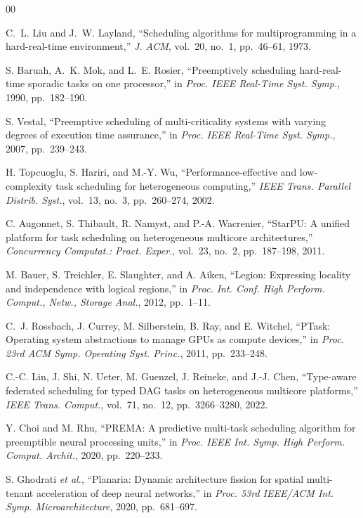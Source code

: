 \documentclass[lettersize,journal]{IEEEtran}
\begin{document}
\clearpage
\begin{thebibliography}{00}

C.~L. Liu and J.~W. Layland, ``Scheduling algorithms for multiprogramming in
a hard-real-time environment,'' \emph{J. ACM}, vol.~20, no.~1, pp.~46--61,
1973.

S. Baruah, A.~K. Mok, and L.~E. Rosier, ``Preemptively scheduling
hard-real-time sporadic tasks on one processor,'' in \emph{Proc. IEEE Real-Time
Syst. Symp.}, 1990, pp.~182--190.

S. Vestal, ``Preemptive scheduling of multi-criticality systems with varying
degrees of execution time assurance,'' in \emph{Proc. IEEE Real-Time Syst.
Symp.}, 2007, pp.~239--243.

H. Topcuoglu, S. Hariri, and M.-Y. Wu, ``Performance-effective and
low-complexity task scheduling for heterogeneous computing,'' \emph{IEEE
Trans. Parallel Distrib. Syst.}, vol.~13, no.~3, pp.~260--274, 2002.

C. Augonnet, S. Thibault, R. Namyst, and P.-A. Wacrenier, ``StarPU: A unified
platform for task scheduling on heterogeneous multicore architectures,''
\emph{Concurrency Computat.: Pract. Exper.}, vol.~23, no.~2, pp.~187--198,
2011.

M. Bauer, S. Treichler, E. Slaughter, and A. Aiken, ``Legion: Expressing
locality and independence with logical regions,'' in \emph{Proc. Int. Conf.
High Perform. Comput., Netw., Storage Anal.}, 2012, pp.~1--11.

C.~J. Rossbach, J. Currey, M. Silberstein, B. Ray, and E. Witchel, ``PTask:
Operating system abstractions to manage GPUs as compute devices,'' in
\emph{Proc. 23rd ACM Symp. Operating Syst. Princ.}, 2011, pp.~233--248.

C.-C. Lin, J. Shi, N. Ueter, M. Guenzel, J. Reineke, and J.-J. Chen,
``Type-aware federated scheduling for typed DAG tasks on heterogeneous
multicore platforms,'' \emph{IEEE Trans. Comput.}, vol.~71, no.~12,
pp.~3266--3280, 2022.

Y. Choi and M. Rhu, ``PREMA: A predictive multi-task scheduling algorithm for
preemptible neural processing units,'' in \emph{Proc. IEEE Int. Symp. High
Perform. Comput. Archit.}, 2020, pp.~220--233.

S. Ghodrati \emph{et al.}, ``Planaria: Dynamic architecture fission for
spatial multi-tenant acceleration of deep neural networks,'' in \emph{Proc.
53rd IEEE/ACM Int. Symp. Microarchitecture}, 2020, pp.~681--697.


\end{thebibliography}
\end{document}
